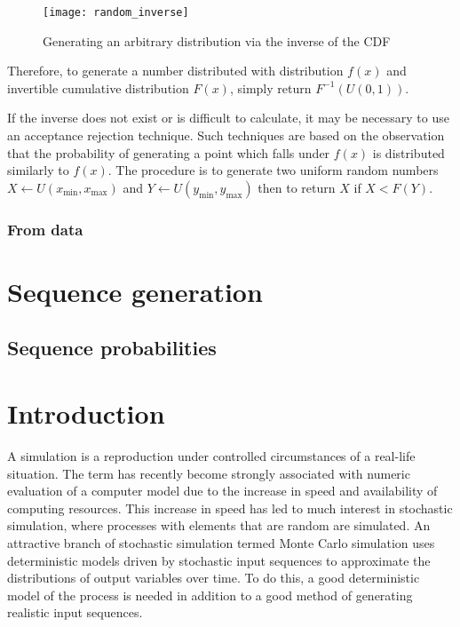 \begin{figure}[htbp]
  \centering
  \texttt{[image: random\_inverse]}
  \caption[Generating an arbitrary distribution via the inverse of the CDF]{Generating an arbitrary distribution via the inverse of the CDF \citep{saucier2000computer}}
  \label{fig:random_inverse}
\end{figure}

Therefore, to generate a number distributed with distribution $f(x)$ and invertible cumulative distribution $F(x)$, simply return $F^{-1}(U(0, 1))$.

If the inverse does not exist or is difficult to calculate, it may be necessary to use an acceptance rejection technique.
Such techniques are based on the observation that the probability of generating a point which falls under $f(x)$ is distributed similarly to $f(x)$.
The procedure is to generate two uniform random numbers $X \leftarrow U(x_{\min}, x_{\max})$ and $Y \leftarrow U(y_{\min}, y_{\max})$ then to return $X$ if $X<F(Y)$.

\subsubsection{From data}


\section{Sequence generation}
\subsection{Sequence probabilities}

\section{Introduction}
A simulation is a reproduction under controlled circumstances of a
real-life situation.  The term has recently become strongly associated
with numeric evaluation of a computer model due to the increase in
speed and availability of computing resources.  This increase in speed
has led to much interest in stochastic simulation, where processes
with elements that are random are simulated.  An attractive branch of
stochastic simulation termed Monte Carlo simulation uses deterministic
models driven by stochastic input sequences to approximate the
distributions of output variables over time.  To do this, a good
deterministic model of the process is needed in addition to a good
method of generating realistic input sequences.

